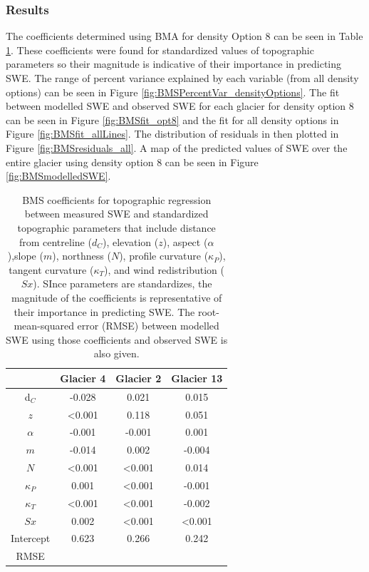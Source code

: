 \documentclass[12pt]{article}
\begin{document}
\subsubsection{Results}

The coefficients determined using BMA for density Option 8 can be seen in Table \ref{tab:BMScoeff}. These coefficients were found for standardized values of topographic parameters so their magnitude is indicative of their importance in predicting SWE. The range of percent variance explained by each variable (from all density options) can be seen in Figure \ref{fig:BMSPercentVar_densityOptions}. The fit between modelled SWE and observed SWE for each glacier for density option 8 can be seen in Figure \ref{fig:BMSfit_opt8} and the fit for all density options in Figure \ref{fig:BMSfit_allLines}. The distribution of residuals in then plotted in Figure \ref{fig:BMSresiduals_all}. A map of the predicted values of SWE over the entire glacier using density option 8 can be seen in Figure \ref{fig:BMSmodelledSWE}.

\begin{table}
\centering
\caption{BMS coefficients for topographic regression between measured SWE and standardized topographic parameters that include distance from centreline ($d_C$), elevation ($z$), aspect ($\alpha$),slope ($m$), northness ($N$), profile curvature ($\kappa_P$), tangent curvature ($\kappa_T$), and wind redistribution ($Sx$). SInce parameters are standardizes, the magnitude of the coefficients is representative of their importance in predicting SWE. The root-mean-squared error (RMSE) between modelled SWE using those coefficients and observed SWE is also given.}
\label{tab:BMScoeff}
\begin{tabular}{cccc}
 & \textbf{Glacier 4} & \textbf{Glacier 2} & \textbf{Glacier 13} \\ \hline
d$_C$ & -0.028 & 0.021 & 0.015 \\
$z$ &  \textless0.001 & 0.118 & 0.051 \\
$\alpha$ & -0.001 & -0.001 & 0.001 \\
$m$ & -0.014 & 0.002 & -0.004 \\
$N$ &  \textless0.001 & \textless0.001 & 0.014 \\
$\kappa_P$ & 0.001 & \textless0.001 & -0.001 \\
$\kappa_T$ & \textless0.001 & \textless0.001 & -0.002 \\
$Sx$ & 0.002 & \textless0.001 & \textless0.001 \\
Intercept & 0.623 & 0.266 & 0.242 \\ \hline
RMSE &  &  & 
\end{tabular}
\end{table}
\end{document}
